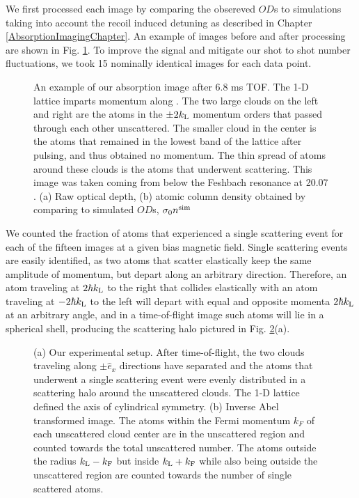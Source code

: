 We first processed each image by comparing the obsereved $OD$s to simulations taking into account the recoil induced detuning as described in Chapter \ref{AbsorptionImagingChapter}. An example of images before and after processing are shown in Fig. \ref{fig:SampleCorrection}.  To improve the signal and mitigate our shot to shot number fluctuations, we took 15 nominally identical images for each data point.
\begin{figure}
\caption[An sample absorption image after 6.8 ms TOF]{An example of our absorption image after 6.8 ms TOF. The 1-D lattice imparts momentum along \ex{}. The two large clouds on the left and right are the atoms in the $\pm 2 k_{\rm{L}}$ momentum orders that passed through each other unscattered. The smaller cloud in the center is the atoms that remained in the lowest band of the lattice after pulsing, and thus obtained no momentum. The thin spread of atoms around these clouds is the atoms that underwent scattering.   This image was taken coming from below the Feshbach resonance at 20.07  \mT{}. (a) Raw optical depth, (b) atomic column density obtained by comparing to simulated $OD$s, $\sigma_0 n^{\rm{sim}}$ }
\label{fig:SampleCorrection}
\end{figure}

We counted the fraction of atoms that experienced a single scattering event for each of the fifteen images at a given bias magnetic field. Single scattering events are easily identified, as two atoms that scatter elastically keep the same amplitude of momentum, but depart along an arbitrary direction. Therefore, an atom traveling at $2 \hbar k_{\rm{L}}$ to the right that collides elastically with an atom traveling at $-2 \hbar k_{\rm{L}}$ to the left will depart with equal and opposite momenta $2 \hbar k_{\rm{L}}$ at an arbitrary angle, and in a time-of-flight image such atoms will lie in a spherical shell, producing the scattering halo pictured in Fig. \ref{fig:halo}(a).
\begin{figure}
\caption[Experimental setup and inverse Abel transform]{(a) Our experimental setup. After time-of-flight, the two clouds traveling along $\pm \hat{e}_x$ directions have separated and the atoms that underwent a single scattering event were evenly distributed in a scattering halo around the unscattered clouds. The 1-D lattice defined the axis of cylindrical symmetry. (b) Inverse Abel transformed image. The atoms within the Fermi momentum $k_F$ of each unscattered cloud center are in the unscattered region and counted towards the total unscattered number. The atoms outside the radius $ k_{\rm{L}}-k_{\rm{F}}$ but inside $k_{\rm{L}}+k_{\rm{F}}$ while also being outside the unscattered region are counted towards the number of single scattered atoms.   }
\label{fig:halo}
\end{figure}

